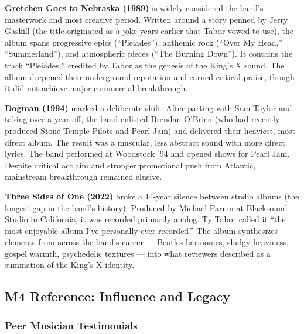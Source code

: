 \documentclass[11pt,letterpaper]{article}
\begin{document}
\textbf{Gretchen Goes to Nebraska (1989)} is widely considered the band's masterwork and most creative period. Written around a story penned by Jerry Gaskill (the title originated as a joke years earlier that Tabor vowed to use), the album spans progressive epics (``Pleiades''), anthemic rock (``Over My Head,'' ``Summerland''), and atmospheric pieces (``The Burning Down''). It contains the track ``Pleiades,'' credited by Tabor as the genesis of the King's X sound. The album deepened their underground reputation and earned critical praise, though it did not achieve major commercial breakthrough.

\textbf{Dogman (1994)} marked a deliberate shift. After parting with Sam Taylor and taking over a year off, the band enlisted Brendan O'Brien (who had recently produced Stone Temple Pilots and Pearl Jam) and delivered their heaviest, most direct album. The result was a muscular, less abstract sound with more direct lyrics. The band performed at Woodstock '94 and opened shows for Pearl Jam. Despite critical acclaim and stronger promotional push from Atlantic, mainstream breakthrough remained elusive.

\textbf{Three Sides of One (2022)} broke a 14-year silence between studio albums (the longest gap in the band's history). Produced by Michael Parnin at Blacksound Studio in California, it was recorded primarily analog. Ty Tabor called it ``the most enjoyable album I've personally ever recorded.'' The album synthesizes elements from across the band's career --- Beatles harmonies, sludgy heaviness, gospel warmth, psychedelic textures --- into what reviewers described as a summation of the King's X identity.

\subsection{M4 Reference: Influence and Legacy}

\subsubsection{Peer Musician Testimonials}
\end{document}
